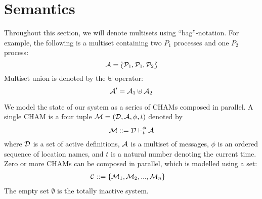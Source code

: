 \section{Semantics}
Throughout this section, we will denote multisets using ``bag''-notation. For
example, the following is a multiset containing two $P_1$ processes and one
$P_2$ process:
\begin{equation*}
 \mathcal{A} = \Lbag \mathcal{P}_1, \mathcal{P}_1, \mathcal{P}_2 \Rbag
\end{equation*}
Multiset union is denoted by the $\uplus$ operator:
\begin{equation*}
 \mathcal{A}' = \mathcal{A}_1 \uplus \mathcal{A}_2
\end{equation*}

We model the state of our system as a series of CHAMs composed in parallel. A
single CHAM is a four tuple $\mathcal{M} = (\mathcal{D}, \mathcal{A}, \phi, t)$ denoted by
\begin{equation*}
 \mathcal{M} ::= \mathcal{D} \vdash_{t}^{\phi} \mathcal{A}
\end{equation*}
where $\mathcal{D}$ is a set of active definitions, $\mathcal{A}$ is a multiset of messages,
$\phi$ is an ordered sequence of location names, and $t$ is a natural number
denoting the current time. Zero or more CHAMs can be composed in parallel, which
is modelled using a set:
\begin{align*}
 \mathcal{C} ::={}& \{ \mathcal{M}_1, \mathcal{M}_2, ..., \mathcal{M}_n \}
\end{align*}
The empty set $\emptyset$ is the totally inactive system.

